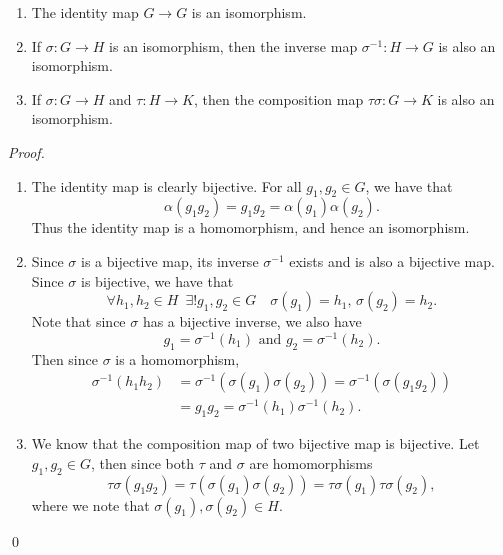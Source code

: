 \begin{propo}
\label{propo:isomorphism_as_an_equivalence_relation}
  \begin{enumerate}
    \item {} The identity map $G \to G$ is an isomorphism.
    \item {} If $\sigma : G \to H$ is an isomorphism, then the inverse map $\sigma^{-1} : H \to G$ is also an isomorphism.
    \item {} If $\sigma : G \to H$ and $\tau : H \to K$, then the composition map $\tau \sigma : G \to K$ is also an isomorphism.
  \end{enumerate}
\end{propo}

\begin{proof}
  \begin{enumerate}
    \item The identity map is clearly bijective. For all $g_1, g_2 \in G$, we have that
      \begin{equation*}
        \alpha(g_1 g_2) = g_1 g_2 = \alpha(g_1)\alpha(g_2).
      \end{equation*}
      Thus the identity map is a homomorphism, and hence an isomorphism.
    
    \item Since $\sigma$ is a bijective map, its inverse $\sigma^{-1}$ exists and is also a bijective map. Since $\sigma$ is bijective, we have that
      \begin{equation*}
        \forall h_1, h_2 \in H \enspace \exists ! g_1, g_2 \in G \quad \sigma(g_1) = h_1, \, \sigma(g_2) = h_2.
      \end{equation*}
      Note that since $\sigma$ has a bijective inverse, we also have
      \begin{equation*}
        g_1 = \sigma^{-1}(h_1) \text{ and } g_2 = \sigma^{-1}(h_2).
      \end{equation*}
      Then since $\sigma$ is a homomorphism,
      \begin{align*}
        \sigma^{-1}(h_1 h_2) &= \sigma^{-1}(\sigma(g_1)\sigma(g_2)) = \sigma^{-1}(\sigma(g_1 g_2)) \\
          &= g_1 g_2 = \sigma^{-1}(h_1) \sigma^{-1}(h_2).
      \end{align*}

    \item We know that the composition map of two bijective map is bijective. Let $g_1, g_2 \in G$, then since both $\tau$ and $\sigma$ are homomorphisms
      \begin{equation*}
        \tau \sigma (g_1 g_2) = \tau( \sigma(g_1) \sigma(g_2) ) = \tau \sigma(g_1) \tau \sigma(g_2),
      \end{equation*}
      where we note that $\sigma(g_1), \sigma(g_2) \in H$.
\end{enumerate}\qed
\end{proof}

